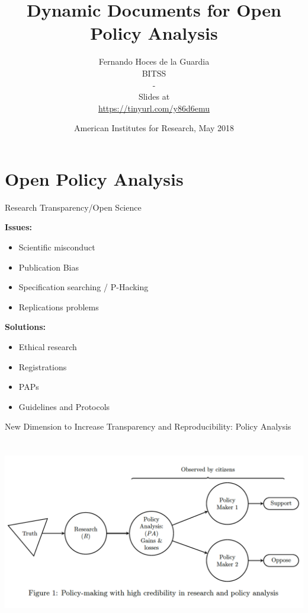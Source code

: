 \documentclass[ignorenonframetext,]{beamer}
\title{Dynamic Documents for Open Policy Analysis}
\author{Fernando Hoces de la Guardia\\
BITSS\\
-\\
Slides at\\
\hspace*{0.333em}\url{https://tinyurl.com/y86d6emu}}
\date{American Institutes for Research, May 2018}
\providecommand{\tightlist}{%
  \setlength{\itemsep}{0pt}\setlength{\parskip}{0pt}}
\begin{document}
\frame{\titlepage}

\begin{frame}
\tableofcontents[hideallsubsections]
\end{frame}
\hypertarget{open-policy-analysis}{%
\section{Open Policy Analysis}\label{open-policy-analysis}}

\begin{frame}{Research Transparency/Open Science}
\protect\hypertarget{research-transparencyopen-science}{}

\textbf{Issues:}

\begin{itemize}
\tightlist
\item
  Scientific misconduct\\
\item
  Publication Bias\\
\item
  Specification searching / P-Hacking\\
\item
  Replications problems
\end{itemize}

\textbf{Solutions:}

\begin{itemize}
\tightlist
\item
  Ethical research
\item
  Registrations
\item
  PAPs
\item
  Guidelines and Protocols
\end{itemize}

\end{frame}

\begin{frame}{New Dimension to Increase Transparency and
Reproducibility: Policy Analysis}
\protect\hypertarget{new-dimension-to-increase-transparency-and-reproducibility-policy-analysis}{}

\centering

\includegraphics[height=3.2in]{../Images/fig1.png}

\end{frame}
\end{document}
